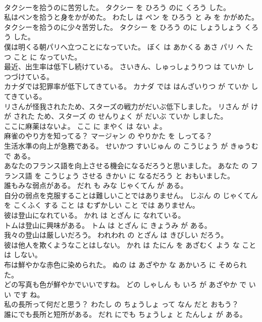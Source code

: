\documentclass[8pt]{extreport}
\begin{document}
\begin{CJK}{UTF8}{min}
\\	タクシーを拾うのに苦労した。	タクシー を ひろう のに くろう した。	
\\	私はペンを拾うと身をかがめた。	わたし は ペン を ひろう と み を かがめた。	
\\	タクシーを拾うのに少々苦労した。	タクシー を ひろう のに しょうしょう くろう した。	
\\	僕は明くる朝パリへ立つことになっていた。	ぼく は あかくる あさ パリ へ たつ こと に なっていた。	
\\	最近、出生率は低下し続けている。	さいきん、しゅっしょうりつ は ていか しつづけている。	
\\	カナダでは犯罪率が低下してきている。	カナダ では はんざいりつ が ていか してきている。	
\\	リさんが怪我されたため、スターズの戦力がだいぶ低下しました。	リさん が けが された ため、スターズ の せんりょく が だいぶ ていか しました。	
\\	ここに麻薬はないよ。	ここ に まやく は ない よ。	
\\	麻雀のやり方を知ってる？	マージャン の やりかた を しってる？	
\\	生活水準の向上が急務である。	せいかつ すいじゅん の こうじょう が きゅうむ で ある。	
\\	あなたのフランス語を向上させる機会になるだろうと思いました。	あなた の フランス語 を こうじょう させる きかい に なるだろう と おもいました。	
\\	誰もみな弱点がある。	だれ も みな じゃくてん が ある。	
\\	自分の弱点を克服することは難しいことではありません。	じぶん の じゃくてん を こくふく する こと は むずかしい こと では ありません。	
\\	彼は登山になれている。	かれ は とざん に なれている。	
\\	トムは登山に興味がある。	トム は とざん に きょうみ が ある。	
\\	我々の登山は厳しいだろう。	われわれ の とざん は きびしい だろう。	
\\	彼は他人を欺くようなことはしない。	かれ は たにん を あざむく よう な こと は しない。	
\\	布は鮮やかな赤色に染められた。	ぬの は あざやか な あかいろ に そめられた。	
\\	どの写真も色が鮮やかでいいですね。	どの しゃしん も いろ が あざやか で いい です ね。	
\\	私の長所って何だと思う？	わたし の ちょうしょ って なん だと おもう？	
\\	誰にでも長所と短所がある。	だれ にでも ちょうしょ と たんしょ が ある。	

\end{CJK}
\end{document}
